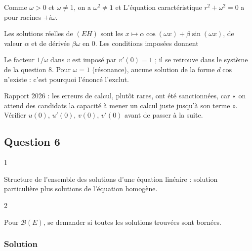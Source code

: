 \documentclass[11pt,a4paper]{article}
\newcommand{\equationajustee}[1]{%
  \sbox{\boiteequation}{$\displaystyle #1$}%
  \ifdim\wd\boiteequation>\linewidth
    \[\resizebox{\linewidth}{!}{\usebox{\boiteequation}}\]%
  \else
    \[#1\]%
  \fi}
\begin{document}
Comme \(\omega>0\) et \(\omega\neq1\), on a \(\omega^2\neq1\) et
\equationajustee{\boxed{d=\frac{1}{\omega^2-1}.}}
L'équation caractéristique \(r^2+\omega^2=0\) a pour racines \(\pm i\omega\).

Les solutions réelles de \((EH)\) sont les \(x\mapsto\alpha\cos(\omega x)+\beta\sin(\omega x)\), de valeur \(\alpha\) et de dérivée \(\beta\omega\) en \(0\). Les conditions imposées donnent
\equationajustee{\boxed{u(x)=\cos(\omega x)}}
\equationajustee{\boxed{v(x)=\frac{\sin(\omega x)}{\omega}.}}

\begin{piege}

Le facteur \(1/\omega\) dans \(v\) est imposé par \(v'(0)=1\) ; il se retrouve dans le système de la question 8. Pour \(\omega=1\) (résonance), aucune solution de la forme \(d\cos\) n'existe : c'est pourquoi l'énoncé l'exclut.

\end{piege}

\begin{jury}

Rapport 2026 : les erreurs de calcul, plutôt rares, ont été sanctionnées, car « on attend des candidats la capacité à mener un calcul juste jusqu'à son terme ». Vérifier \(u(0)\), \(u'(0)\), \(v(0)\), \(v'(0)\) avant de passer à la suite.

\end{jury}

\hypertarget{question-6}{%
\subsection{Question 6}\label{question-6}}

\begin{indication}{1}

Structure de l'ensemble des solutions d'une équation linéaire : solution particulière plus solutions de l'équation homogène.

\end{indication}

\begin{indication}{2}

Pour \(\mathcal B(E)\), se demander si toutes les solutions trouvées sont bornées.

\end{indication}

\hypertarget{solution-5}{%
\subsubsection{Solution}\label{solution-5}}
\end{document}
